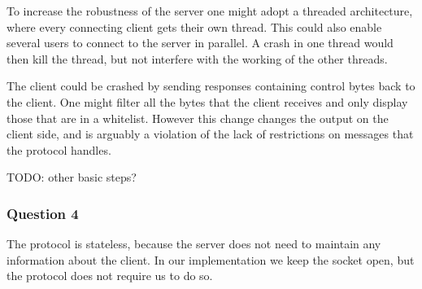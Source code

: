 To increase the robustness of the server one might adopt a threaded architecture, where every connecting client gets their own thread.
This could also enable several users to connect to the server in parallel. A crash in one thread would then kill the thread, but not
interfere with the working of the other threads.

The client could be crashed by sending responses containing control bytes back to the client. One might filter all the bytes that
the client receives and only display those that are in a whitelist. However this change changes the output on the client side, and
is arguably a violation of the lack of restrictions on messages that the protocol handles.

TODO: other basic steps?

\subsubsection{Question 4}

The protocol is stateless, because the server does not need to maintain any information about the client. In our implementation we keep the socket open, but the protocol does not require us to do so.
